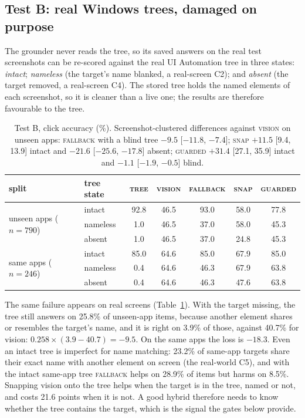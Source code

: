 \documentclass[11pt]{article}
\newcommand{\tree}{\textsc{tree}}
\newcommand{\vis}{\textsc{vision}}
\newcommand{\fb}{\textsc{fallback}}
\begin{document}
\subsection{Test B: real Windows trees, damaged on purpose}
The grounder never reads the tree, so its saved answers on the real test screenshots can be re-scored
against the real UI Automation tree in three states: \emph{intact}; \emph{nameless} (the target's name
blanked, a real-screen C2); and \emph{absent} (the target removed, a real-screen C4). The stored tree holds
the named elements of each screenshot, so it is cleaner than a live one; the results are therefore
favourable to the tree.

\begin{table}[t]
\centering\small
\begin{tabular}{llccccc}
\toprule
split & tree state & \tree & \vis & \fb & \textsc{snap} & \textsc{guarded} \\
\midrule
\multirow{3}{*}{unseen apps ($n{=}790$)} & intact & 92.8 & 46.5 & 93.0 & 58.0 & 77.8 \\
& nameless & 1.0 & 46.5 & 37.0 & 58.0 & 45.3 \\
& absent & 1.0 & 46.5 & 37.0 & 24.8 & 45.3 \\
\midrule
\multirow{3}{*}{same apps ($n{=}246$)} & intact & 85.0 & 64.6 & 85.0 & 67.9 & 85.0 \\
& nameless & 0.4 & 64.6 & 46.3 & 67.9 & 63.8 \\
& absent & 0.4 & 64.6 & 46.3 & 47.6 & 63.8 \\
\bottomrule
\end{tabular}
\caption{Test B, click accuracy (\%). Screenshot-clustered differences against \vis{} on unseen apps:
\fb{} with a blind tree $-9.5$ [$-11.8$, $-7.4$]; \textsc{snap} $+11.5$ [9.4, 13.9] intact and $-21.6$
[$-25.6$, $-17.8$] absent; \textsc{guarded} $+31.4$ [27.1, 35.9] intact and $-1.1$ [$-1.9$, $-0.5$] blind.}
\label{tab:testb}
\end{table}

The same failure appears on real screens (Table~\ref{tab:testb}). With the target missing, the tree still
answers on 25.8\% of unseen-app items, because another element shares or resembles the target's name, and
it is right on 3.9\% of those, against 40.7\% for vision: $0.258 \times (3.9 - 40.7) = -9.5$. On the same
apps the loss is $-18.3$. Even an intact tree is imperfect for name matching: 23.2\% of same-app targets
share their exact name with another element on screen (the real-world C5), and with the intact same-app
tree \fb{} helps on 28.9\% of items but harms on 8.5\%. Snapping vision onto the tree helps when the target
is in the tree, named or not, and costs 21.6 points when it is not. A good hybrid therefore needs to know
whether the tree contains the target, which is the signal the gates below provide.
\end{document}
